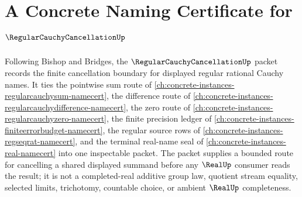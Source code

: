 \chapter{A Concrete Naming Certificate for $\RegularCauchyCancellationUp$}
\label{ch:concrete-instances-regular-cauchy-cancellation-namecert}

Following Bishop and Bridges, the $\RegularCauchyCancellationUp$ packet records the finite cancellation boundary for displayed regular rational Cauchy names. It ties the pointwise sum route of \autoref{ch:concrete-instances-regularcauchysum-namecert}, the difference route of \autoref{ch:concrete-instances-regularcauchydifference-namecert}, the zero route of \autoref{ch:concrete-instances-regularcauchyzero-namecert}, the finite precision ledger of \autoref{ch:concrete-instances-finiteerrorbudget-namecert}, the regular source rows of \autoref{ch:concrete-instances-regseqrat-namecert}, and the terminal real-name seal of \autoref{ch:concrete-instances-real-namecert} into one inspectable packet. The packet supplies a bounded route for cancelling a shared displayed summand before any $\RealUp$ consumer reads the result; it is not a completed-real additive group law, quotient stream equality, selected limits, trichotomy, countable choice, or ambient $\RealUp$ completeness.

